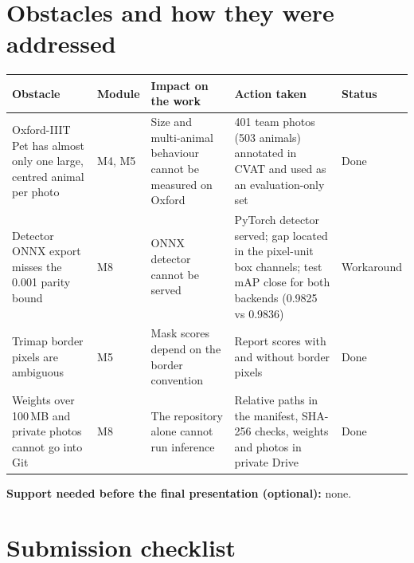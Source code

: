 \documentclass[11pt,a4paper]{article}
\begin{document}
\section{Obstacles and how they were addressed}

\medskip
{\small
\begin{tabularx}{\linewidth}{@{}Y l Y Y l@{}}
\toprule
Obstacle & Module & Impact on the work & Action taken & Status \\
\midrule
Oxford-IIIT Pet has almost only one large, centred animal per photo & M4, M5 & Size and multi-animal behaviour cannot be measured on Oxford & 401 team photos (503 animals) annotated in CVAT and used as an evaluation-only set & Done \\
Detector ONNX export misses the 0.001 parity bound & M8 & ONNX detector cannot be served & PyTorch detector served; gap located in the pixel-unit box channels; test mAP close for both backends (0.9825 vs 0.9836) & Workaround \\
Trimap border pixels are ambiguous & M5 & Mask scores depend on the border convention & Report scores with and without border pixels & Done \\
Weights over 100\,MB and private photos cannot go into Git & M8 & The repository alone cannot run inference & Relative paths in the manifest, SHA-256 checks, weights and photos in private Drive & Done \\
\bottomrule
\end{tabularx}}

\smallskip
\textbf{Support needed before the final presentation (optional):} none.

\section{Submission checklist}
\end{document}
